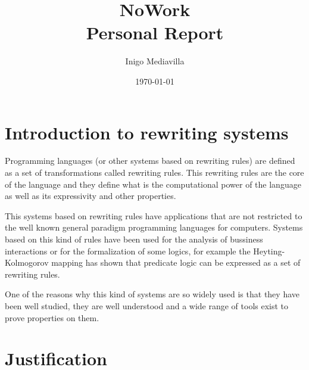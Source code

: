 \documentclass[12pt,a4paper]{article}
\title{NoWork\\ Personal Report}
\author{Inigo Mediavilla\\[2em]}
\date\today
\begin{document}
\maketitle


\section{Introduction to rewriting systems}

Programming languages (or other systems based on rewriting rules)
are defined as a set of transformations called
rewriting rules. This rewriting rules are the core of the language and
they define what is the computational power of the language as well as
its expressivity and other properties.

This systems based on rewriting rules have applications that are not
restricted to the well known general paradigm programming languages
for computers. Systems based on this kind of rules have been used for
the analysis of bussiness interactions or for the formalization of
some logics, for example the Heyting-Kolmogorov mapping has shown that
predicate logic can be expressed as a set of rewriting rules.

One of the reasons why this kind of systems are so widely used is that
they have been well studied, they are well understood and a
wide range of tools exist to prove properties on them.

\section{Justification}
\end{document}
